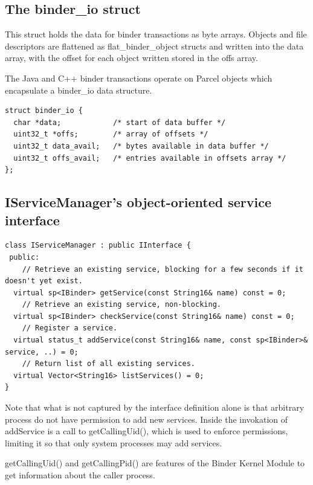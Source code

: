 \documentclass[prodmode]{acmlarge}
\begin{document}
\subsection{The binder\_io struct}
This struct holds the data for binder transactions as byte arrays. Objects and file descriptors are flattened as flat\_binder\_object structs and written into the data array, with the offset for each object written stored in the offs array.

The Java and C++ binder transactions operate on Parcel objects which encapsulate a binder\_io data structure.
\begin{Verbatim}[samepage=true]
struct binder_io {
  char *data;            /* start of data buffer */
  uint32_t *offs;        /* array of offsets */
  uint32_t data_avail;   /* bytes available in data buffer */
  uint32_t offs_avail;   /* entries available in offsets array */
};
\end{Verbatim}

\subsection{IServiceManager's object-oriented service interface}
\begin{Verbatim}[samepage=true]
class IServiceManager : public IInterface {
 public:
    // Retrieve an existing service, blocking for a few seconds if it doesn't yet exist.
  virtual sp<IBinder> getService(const String16& name) const = 0;
    // Retrieve an existing service, non-blocking.
  virtual sp<IBinder> checkService(const String16& name) const = 0;
    // Register a service.
  virtual status_t addService(const String16& name, const sp<IBinder>& service, ..) = 0;
    // Return list of all existing services.
  virtual Vector<String16> listServices() = 0;
}
\end{Verbatim}

Note that what is not captured by the interface definition alone is that arbitrary process do not have permission to add new services. Inside the invokation of addService is a call to getCallingUid(), which is used to enforce permissions, limiting it so that only system processes may add services.

getCallingUid() and getCallingPid() are features of the Binder Kernel Module to get information about the caller process.
\end{document}
